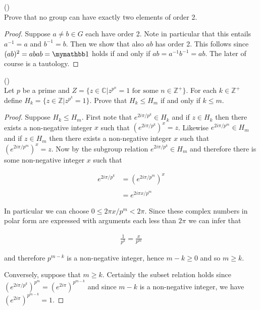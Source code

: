 \documentclass{exam}
\begin{document}
\begin{questions}
\vspace{1cm}

\question()\\
Prove that no group can have exactly two elements of order 2.

\begin{proof}
  Suppose $a\ne b\in G$ each have order 2.  Note in particular that this entails $a^{-1}=a$ and $b^{-1}=b$.  Then we show that also $ab$ has order 2.  This follows since $(ab)^2 = abab = \mymathbb 1$ holds if and only if $ab = a^{-1}b^{-1}=ab$.  The later of course is a tautology.
\end{proof}

\vspace{1cm}

\question()\\
Let $p$ be a prime and $Z=\{z\in\mathbb C|z^{p^n}=1 \text{ for some } n\in\mathbb Z^+\}$.  For each $k\in\mathbb Z^+$ define $H_k=\{z\in\mathbb Z|z^{p^k}=1\}$.  Prove that $H_k\leq H_m$ if and only if $k\leq m$.

\begin{proof}
  Suppose $H_k\leq H_m$.  First note that $e^{2i\pi/p^k}\in H_k$ and if $z\in H_k$ then there exists a non-negative integer $x$ such that $(e^{2i\pi/p^k})^x=z$. Likewise $e^{2i\pi/p^m}\in H_m$ and if $z\in H_m$ then there exists a non-negative integer $x$ such that $(e^{2i\pi/p^m})^x=z$.  Now by the subgroup relation $e^{2i\pi/p^k}\in H_m$ and therefore there is some non-negative integer $x$ such that

  \begin{align*}
    e^{2i\pi/p^k} &= (e^{2i\pi/p^m})^x \\\\
    &= e^{2i\pi x/p^m}
  \end{align*}

  In particular we can choose $0\leq 2\pi x/p^m < 2\pi$.  Since these complex numbers in polar form are expressed with arguments each less than $2\pi$ we can infer that

  \begin{align*}
    \frac{1}{p^k} = \frac{x}{p^m}
  \end{align*}

  and therefore $p^{m-k}$ is a non-negative integer, hence $m-k\geq 0$ and so $m\geq k$.

  Conversely, suppose that $m\geq k$.  Certainly the subset relation holds since $(e^{2i\pi/p^k})^{p^m}=(e^{2i\pi})^{p^{m-k}}$ and since $m-k$ is a non-negative integer, we have $(e^{2i\pi})^{p^{m-k}}=1$.


\end{proof}
\end{questions}
\end{document}
